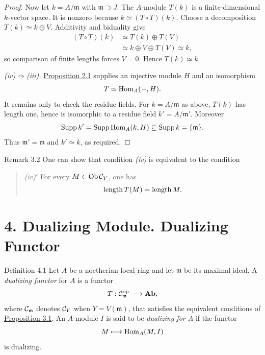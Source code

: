 \begin{proof}
Now let $k=A/\mathfrak m$ with $\mathfrak m\supset J$. The $A$-module
$T(k)$ is a finite-dimensional $k$-vector space. It is nonzero because
$k\simeq(T\circ T)(k)$. Choose a decomposition $T(k)\simeq k\oplus V$.
Additivity and biduality give
\[
\begin{aligned}
  (T\circ T)(k)
    &\simeq T(k)\oplus T(V)\\
    &\simeq k\oplus V\oplus T(V)\simeq k,
\end{aligned}
\]
so comparison of finite lengths forces $V=0$. Hence $T(k)\simeq k$.

\smallskip\noindent
\emph{(iv)$\Rightarrow$(iii).}
\hyperref[IV.2.1]{Proposition 2.1} supplies an injective module $H$ and an isomorphism
\[
  T\simeq\operatorname{Hom}_A(-,H).
\]
It remains only to check the residue fields.
For $k=A/\mathfrak m$ as above, $T(k)$ has length one, hence is isomorphic
to a residue field $k'=A/\mathfrak m'$. Moreover
\[
  \operatorname{Supp} k'=\operatorname{Supp}\operatorname{Hom}_A(k,H)\subseteq\operatorname{Supp} k=\{\mathfrak m\}.
\]
Thus $\mathfrak m'=\mathfrak m$ and $k'\simeq k$, as required.
\end{proof}


\begin{sgastatement}{Remark 3.2}
One can show that condition \emph{(iv)} is equivalent to the condition
\begin{quote}
\emph{(iv)$'$} For every $M\in\operatorname{Ob}\mathcal C_Y$, one has
\[
  \operatorname{length} T(M)=\operatorname{length} M.
\]
\end{quote}
\end{sgastatement}

\section*{4. Dualizing Module. Dualizing Functor}

\begin{sgastatement}{Definition 4.1}
Let $A$ be a noetherian local ring and let $\mathfrak m$ be its maximal
ideal. A \emph{dualizing functor} for $A$ is a functor
\[
  T:\mathcal C_{\mathfrak m}^{\mathrm{op}}\longrightarrow\mathbf{Ab},
\]
where $\mathcal C_{\mathfrak m}$ denotes $\mathcal C_Y$ when
$Y=V(\mathfrak m)$, that satisfies the equivalent conditions of
\hyperref[IV.3.1]{Proposition 3.1}. An $A$-module $I$ is said to be \emph{dualizing for
$A$} if the functor
\[
  M\longmapsto\operatorname{Hom}_A(M,I)
\]
is dualizing.
\end{sgastatement}

